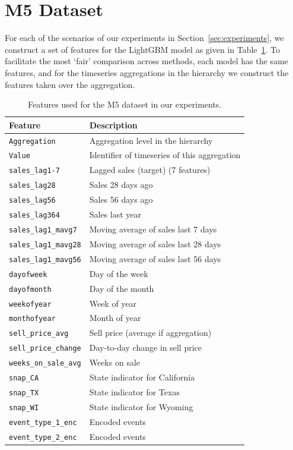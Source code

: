 \documentclass[preprint, 3p, times, twocolumn]{elsarticle}
\begin{document}
\section{M5 Dataset} \label{app:m5dataset}
For each of the scenarios of our experiments in Section~\ref{sec:experiments}, we construct a set of features for the LightGBM model as given in Table~\ref{tab:features}. To facilitate the most `fair' comparison across methods, each model has the same features, and for the timeseries aggregations in the hierarchy we construct the features taken over the aggregation. 
\begin{table}
  \caption{Features used for the M5 dataset in our experiments.}
  \label{tab:features}
  \begin{center}
  {\small\setlength{\tabcolsep}{1pt} 
  \begin{tabular}{l l }
  \toprule 
  Feature & Description \\
  \midrule
  \texttt{Aggregation} & Aggregation level in the hierarchy \\
  \texttt{Value} & Identifier of timeseries of this aggregation \\   
  \texttt{sales\_lag1-7} & Lagged sales (target) (7 features) \\
  \texttt{sales\_lag28} & Sales 28 days ago \\ 
  \texttt{sales\_lag56} & Sales 56 days ago \\ 
  \texttt{sales\_lag364} & Sales last year \\ 
  \texttt{sales\_lag1\_mavg7} & Moving average of sales last 7 days \\
  \texttt{sales\_lag1\_mavg28} & Moving average of sales last 28 days \\ 
  \texttt{sales\_lag1\_mavg56} & Moving average of sales last 56 days\\ 
  \texttt{dayofweek} & Day of the week \\ 
  \texttt{dayofmonth} & Day of the month \\
  \texttt{weekofyear} & Week of year \\ 
  \texttt{monthofyear} & Month of year \\ 
  \texttt{sell\_price\_avg} & Sell price (average if aggregation)\\ 
  \texttt{sell\_price\_change} & Day-to-day change in sell price\\
  \texttt{weeks\_on\_sale\_avg} & Weeks on sale \\ 
  \texttt{snap\_CA} & State indicator for California \\ 
  \texttt{snap\_TX} & State indicator for Texas \\ 
  \texttt{snap\_WI} & State indicator for Wyoming \\
  \texttt{event\_type\_1\_enc} & Encoded events \\ 
  \texttt{event\_type\_2\_enc} & Encoded events \\
  \bottomrule
  \end{tabular}}
  \end{center}
\end{table}
\end{document}
